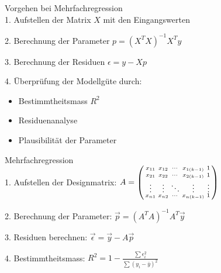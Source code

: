 \begin{KR}{Vorgehen bei Mehrfachregression}\\
1. Aufstellen der Matrix $X$ mit den Eingangswerten

2. Berechnung der Parameter $p = (X^TX)^{-1}X^Ty$

3. Berechnung der Residuen $\epsilon = y - Xp$

4. Überprüfung der Modellgüte durch:
   \begin{itemize}
     \item Bestimmtheitsmass $R^2$
     \item Residuenanalyse
     \item Plausibilität der Parameter
   \end{itemize}
\end{KR}

\begin{concept}{Mehrfachregression}
  \vspace{-4mm}\\
1. Aufstellen der Designmatrix:
   $A = \begin{psmallmatrix} 
   x_{11} & x_{12} & \cdots & x_{1(k-1)} & 1 \\
   x_{21} & x_{22} & \cdots & x_{2(k-1)} & 1 \\
   \vdots & \vdots & \ddots & \vdots & \vdots \\
   x_{n1} & x_{n2} & \cdots & x_{n(k-1)} & 1
   \end{psmallmatrix}$

2. Berechnung der Parameter:
   $\vec{p} = (A^T A)^{-1} A^T \vec{y}$

3. Residuen berechnen:
   $\vec{\epsilon} = \vec{y} - A\vec{p}$

4. Bestimmtheitsmass:
   $R^2 = 1 - \frac{\sum \epsilon_i^2}{\sum(y_i - \bar{y})^2}$
\end{concept}

